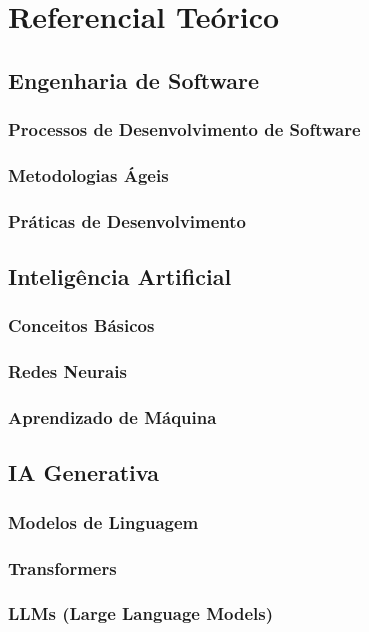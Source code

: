 

\chapter{Referencial Teórico}
\label{cap:fundamentacao}

\section{Engenharia de Software}
\subsection{Processos de Desenvolvimento de Software}
\subsection{Metodologias Ágeis}
\subsection{Práticas de Desenvolvimento}

\section{Inteligência Artificial}
\subsection{Conceitos Básicos}
\subsection{Redes Neurais}
\subsection{Aprendizado de Máquina}

\section{IA Generativa}
\subsection{Modelos de Linguagem}
\subsection{Transformers}
\subsection{LLMs (Large Language Models)} 